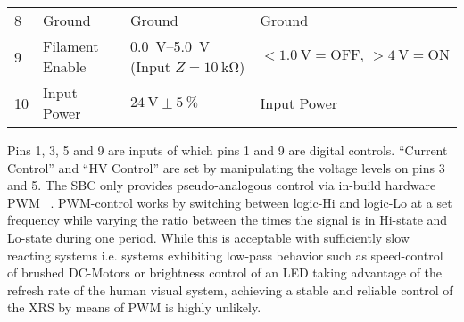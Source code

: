 \begin{table}
\begin{tabular}{@{}llll@{}}
                    8&      Ground&         Ground&                                                             Ground\\
                    9&      Filament Enable&\qtyrange{0.0}{+5.0}{\volt} (Input \(Z = \qty{10}{\kilo\ohm}\))&     \(< \qty{1.0}{\volt} = \text{OFF, } >\qty{4}{\volt} = \text{ON}\)\\
                    10&     Input Power&    \(\qty{24}{\volt} \pm \qty{5}{\percent}\)&  Input Power\\
                    \bottomrule
                \end{tabular}
            \end{table}
            Pins 1, 3, 5 and 9 are inputs of which pins 1 and 9 are digital controls.
            ``Current Control'' and ``HV Control'' are set by manipulating the voltage levels on pins 3 and 5.
            The SBC only provides pseudo-analogous control via in-build hardware PWM ~\cite{Manual.Documentation.RPF}.
            PWM-control works by switching between logic-Hi and logic-Lo at a set frequency while varying the ratio between the times the signal is in Hi-state and Lo-state during one period.
            While this is acceptable with sufficiently slow reacting systems i.e. systems exhibiting low-pass behavior such as speed-control of brushed DC-Motors or brightness control of an LED taking advantage of the refresh rate of the human visual system, achieving a stable and reliable control of the XRS by means of PWM is highly unlikely.\par\medskip

